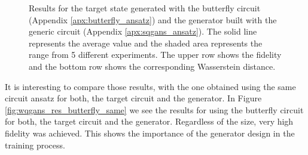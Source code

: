 \begin{figure}[htbp!]
  \caption{
    Results for the target state generated with the butterfly circuit (Appendix
    \ref{apx:butterfly_ansatz}) and the generator built with the generic circuit (Appendix \ref{apx:sqgans_ansatz}).
    The solid line represents the average value and the shaded area
    represents the range from 5 different experiments. The upper row shows the
    fidelity and the bottom row shows the corresponding Wasserstein distance.}
  \label{fig:wqgans_res_butterfly_1}
\end{figure}

It is interesting to compare those results, with the one obtained using the
same circuit ansatz for both, the target circuit and the generator. In Figure
\ref{fig:wqgans_res_butterfly_same} we see the results for using the butterfly
circuit for both, the target circuit and the generator. Regardless of the size, very high
fidelity was achieved. This shows the importance of the generator design in the
training process.


